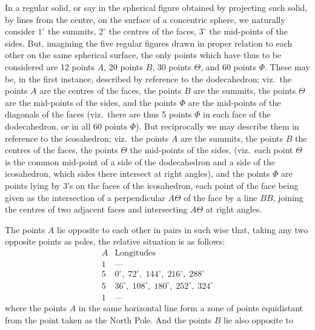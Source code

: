 \documentclass[11pt,a4paper]{article}
\begin{document}
\medskip

\noindent In a regular solid, or say in the spherical figure obtained by projecting such solid, by lines from the centre, on the surface of a concentric sphere, we naturally consider $1^{\circ}$ the summits, $2^{\circ}$ the centres of the faces, $3^{\circ}$ the mid-points of the sides. But, imagining the five regular figures drawn in proper relation to each other on the same spherical surface, the only points which have thus to be considered are 12 points $A$, 20 points $B$, 30 points $\Theta$, and 60 points $\Phi$. These may be, in the first instance, described by reference to the dodecahedron; viz.\ the points $A$ are the centres of the faces, the points $B$ are the summits, the points $\Theta$ are the mid-points of the sides, and the points $\Phi$ are the mid-points of the diagonals of the faces (viz.\ there are thus 5 points $\Phi$ in each face of the dodecahedron, or in all 60 points $\Phi$). But reciprocally we may describe them in reference to the icosahedron; viz.\ the points $A$ are the summits, the points $B$ the centres of the faces, the points $\Theta$ the mid-points of the sides, (viz.\ each point $\Theta$ is the common mid-point of a side of the dodecahedron and a side of the icosahedron, which sides there intersect at right angles), and the points $\Phi$ are points lying by $3$'s on the faces of the icosahedron, each point of the face being given as the intersection of a perpendicular $A\Theta$ of the face by a line $BB$, joining the centres of two adjacent faces and intersecting $A\Theta$ at right angles.

\medskip

The points $A$ lie opposite to each other in pairs in such wise that, taking any two opposite points as poles, the relative situation is as follows:
\[
\begin{array}{c|l}
A & \text{Longitudes}\\
\hline
1 & \text{---}\\
5 & 0^{\circ},\; 72^{\circ},\; 144^{\circ},\; 216^{\circ},\; 288^{\circ}\\
5 & 36^{\circ},\; 108^{\circ},\; 180^{\circ},\; 252^{\circ},\; 324^{\circ}\\
1 & \text{---}
\end{array}
\]
where the points $A$ in the same horizontal line form a zone of points equidistant from the point taken as the North Pole. And the points $B$ lie also opposite to

\newpage

\end{document}
